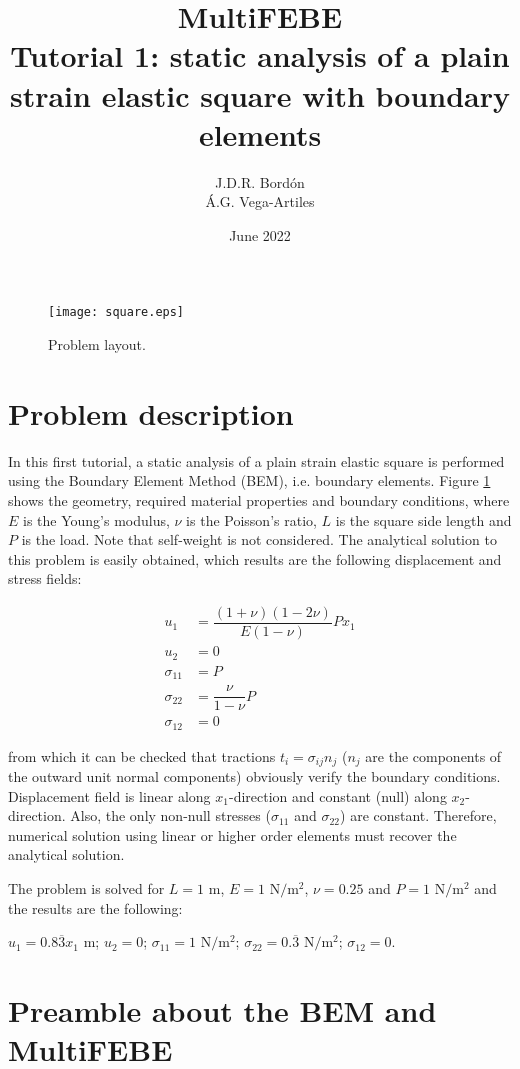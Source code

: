 \documentclass[A4]{article}
\title{MultiFEBE \\ Tutorial 1: static analysis of a plain strain elastic square with boundary elements}
\author{J.D.R. Bord\'on\\ \'A.G. Vega-Artiles}
\date{June 2022}
\begin{document}
\maketitle

\begin{figure}[h]
\centering
\texttt{[image: square.eps]}
\caption{Problem layout.}
\label{fig:layout}
\end{figure}

\section{Problem description}

In this first tutorial, a static analysis of a plain strain elastic square is performed using the Boundary Element Method (BEM), i.e. boundary elements. Figure \ref{fig:layout} shows the geometry, required material properties and boundary conditions, where $E$ is the Young's modulus, $\nu$ is the Poisson's ratio, $L$ is the square side length and $P$ is the load. Note that self-weight is not considered. The analytical solution to this problem is easily obtained, which results are the following displacement and stress fields:

\begin{align}
u_1 &= \dfrac{(1+\nu)(1-2\nu)}{E(1-\nu)} P x_1 \\
u_2 &= 0 \\
\sigma_{11} &= P \\
\sigma_{22} &= \dfrac{\nu}{1-\nu}P \\
\sigma_{12} &= 0
\end{align}

from which it can be checked that tractions $t_i=\sigma_{ij}n_j$ ($n_j$ are the components of the outward unit normal components) obviously verify the boundary conditions. Displacement field is linear along $x_1$-direction and constant (null) along $x_2$-direction. Also, the only non-null stresses ($\sigma_{11}$ and $\sigma_{22}$) are constant. Therefore, numerical solution using linear or higher order elements must recover the analytical solution.

The problem is solved for $L=1$ $\mathrm{m}$, $E=1$ $\mathrm{N/m^2}$, $\nu=0.25$  and $P=1$ $\mathrm{N/m^2}$ and the results are the following:

	$u_1 = 0.8\overline{3} x_1$ $\mathrm{m}$;
	$u_2 = 0$;
	$\sigma_{11} = 1$ $\mathrm{N/m^2}$;
	$\sigma_{22} = 0.\overline{3}$ $\mathrm{N/m^2}$;
	$\sigma_{12} = 0$.

\section{Preamble about the BEM and MultiFEBE}
\end{document}
